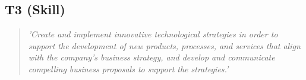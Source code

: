 \subsection{T3 (Skill)}

  \begin{quote}
    \textit{'Create and implement innovative technological
    strategies in order to support the development of new
    products, processes, and services that align with the
    company’s business strategy, and develop and
    communicate compelling business proposals to support
    the strategies.'}
  \end{quote}

\newpage